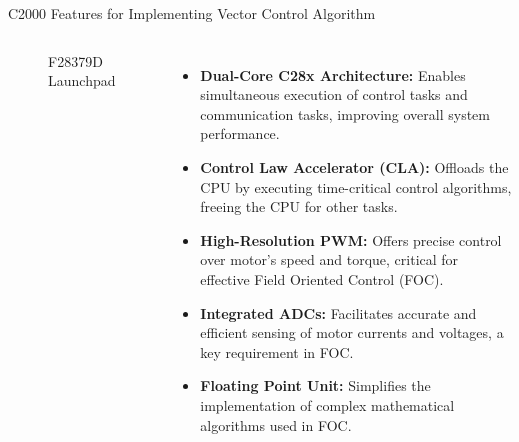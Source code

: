 \begin{frame}{C2000 Features for Implementing Vector Control Algorithm}
	\begin{columns}
		\begin{figure}
			\centering
			\caption{F28379D Launchpad}
		\end{figure}
		\begin{itemize}
			\item \textbf{Dual-Core C28x Architecture:} Enables simultaneous execution of control tasks and communication tasks, improving overall system performance.
			\item \textbf{Control Law Accelerator (CLA):} Offloads the CPU by executing time-critical control algorithms, freeing the CPU for other tasks.
			\item \textbf{High-Resolution PWM:} Offers precise control over motor's speed and torque, critical for effective Field Oriented Control (FOC).
			\item \textbf{Integrated ADCs:} Facilitates accurate and efficient sensing of motor currents and voltages, a key requirement in FOC.
			\item \textbf{Floating Point Unit:} Simplifies the implementation of complex mathematical algorithms used in FOC.
		\end{itemize}
	\end{columns}
\end{frame}


